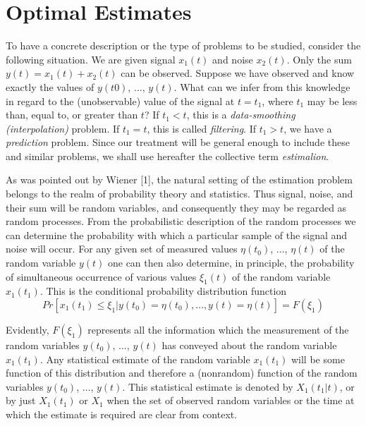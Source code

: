 \documentclass{article}
\begin{document}
\section{Optimal Estimates}
To have a concrete description or the type of problems to be studied, consider the following situation. We are given signal $x_1(t)$ and noise $x_2(t)$. Only the sum $y(t) = x_1(t) + x_2(t)$ can be observed. Suppose we have observed and know exactly the values of $y(t0)$, $\dotsc$, $y(t)$. What can we infer from this knowledge in regard to the (unobservable) value of the signal at $t = t_1$, where $t_1$ may be less than, equal to, or greater than $t$? If $t_1 < t$, this is a \emph{data-smoothing (interpolation)} problem. If $t_1 = t$, this is called \emph{filtering}. If $t_1 > t$, we have a \emph{prediction} problem. Since our treatment will be general enough to include these and similar problems, we shall use hereafter the collective term \emph{estimalion}.

As was pointed out by Wiener [1], the natural setting of the estimation problem belongs to the realm of probability theory and statistics. Thus signal, noise, and their sum will be random variables, and consequently they may be regarded as random processes. From the probabilistic description of the random processes we can determine the probability with which a particular sample of the signal and noise will occur. For any given set of measured values $\eta(t_0)$, $\dotsc$, $\eta(t)$ of the random variable $y(t)$ one can then also determine, in principle, the probability of simultaneous occurrence of various values $\xi_1(t)$ of the random variable $x_1(t_1)$. This is the conditional probability distribution function
\begin{equation}
\label{eneq1}
Pr[x_1(t_1) \le \xi_1 \vert y(t_0)=\eta(t_0), \dotsc, y(t)=\eta(t)]=F(\xi_1)
\end{equation}

Evidently, $F(\xi_1)$ represents all the information which the measurement of the random variables $y(t_0)$, $\dotsc$, $y(t)$ has conveyed about the random variable $x_1(t_1)$. Any statistical estimate of the random variable $x_1(t_1)$ will be some function of this distribution and therefore a (nonrandom) function of the random variables $y(t_0)$, $\dotsc$, $y(t)$. This statistical estimate is denoted by $X_1(t_1 \vert t)$, or by just $X_1(t_1)$ or $X_1$ when the set of observed random variables or the time at which the estimate is required are clear from context.
\end{document}
